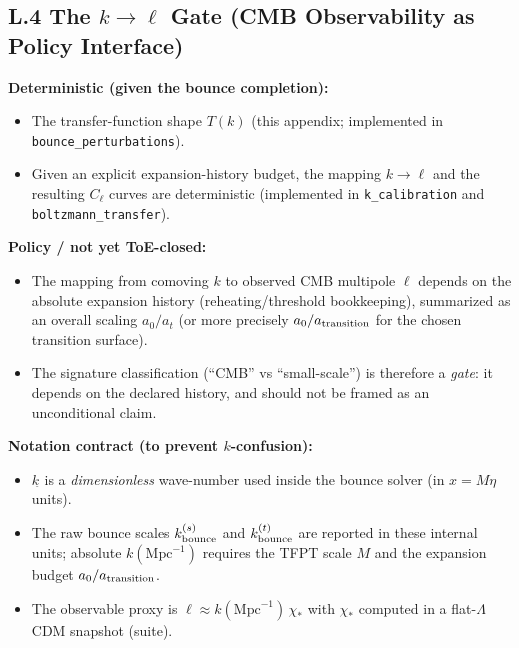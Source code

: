 \subsection{\texorpdfstring{L.4 The $k\to\ell$ Gate (CMB Observability as Policy Interface)}{L.4 The k->ell Gate (CMB Observability as Policy Interface)}}
\begin{tcolorbox}[colback=yellow!3, colframe=yellow!60!black,
    title={\textbf{What is deterministic vs.\ what is still policy}}, fonttitle=\bfseries\small]
\textbf{Deterministic (given the bounce completion):}
\begin{itemize}[leftmargin=1.5em, topsep=2pt, itemsep=1pt]
    \item The transfer-function shape $T(k)$ (this appendix; implemented in \texttt{bounce\_perturbations}).
    \item Given an explicit expansion-history budget, the mapping $k\to\ell$ and the resulting $C_\ell$ curves are deterministic (implemented in \texttt{k\_calibration} and \texttt{boltzmann\_transfer}).
\end{itemize}

\textbf{Policy / not yet ToE-closed:}
\begin{itemize}[leftmargin=1.5em, topsep=2pt, itemsep=1pt]
    \item The mapping from comoving $k$ to observed CMB multipole $\ell$ depends on the absolute expansion history (reheating/threshold bookkeeping), summarized as an overall scaling $a_0/a_t$ (or more precisely $a_0/a_{\rm transition}$ for the chosen transition surface).
    \item The signature classification (``CMB'' vs ``small-scale'') is therefore a \emph{gate}: it depends on the declared history, and should not be framed as an unconditional claim.
\end{itemize}

\textbf{Notation contract (to prevent $k$-confusion):}
\begin{itemize}[leftmargin=1.5em, topsep=2pt, itemsep=1pt]
    \item $k_{\hat{}}$ is a \emph{dimensionless} wave-number used inside the bounce solver (in $x=M\eta$ units).
    \item The raw bounce scales $k^{(s)}_{\rm bounce}$ and $k^{(t)}_{\rm bounce}$ are reported in these internal units; absolute $k(\mathrm{Mpc}^{-1})$ requires the TFPT scale $M$ and the expansion budget $a_0/a_{\rm transition}$.
    \item The observable proxy is $\ell \approx k(\mathrm{Mpc}^{-1})\,\chi_*$ with $\chi_*$ computed in a flat-$\Lambda$CDM snapshot (suite).
\end{itemize}


\end{tcolorbox}
